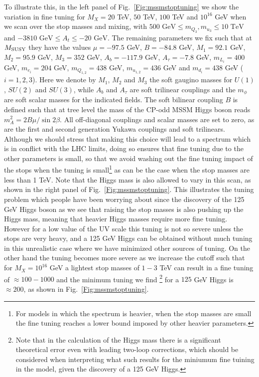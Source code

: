 \documentclass[preprint,amsmath,amssymb,aps,superscriptaddress,prd,
showpacs,floatfix,nofootinbib]{revtex4-1}
\begin{document}
To illustrate this, in the left panel of Fig.~\ref{Fig:mssmstoptuning}
we show the variation in fine tuning for $M_X = 20$ TeV, $50$ TeV, $100$
TeV and $10^{16}$ GeV when we scan over the stop masses and mixing,
with $500 \textrm{ GeV} \leq m_{Q_3} , m_{u_3} \leq 10 \textrm{ TeV}$ and
$-3810\textrm{ GeV} \leq A_t \leq -20 \textrm{ GeV}$.  The remaining
parameters we fix such that at $M_{\rm SUSY}$ they have the values
$\mu = -97.5$ GeV, $B = -84.8$ GeV, $M_1 = 92.1$ GeV, $M_2 = 95.9$ GeV,
$M_3 = 352$ GeV, $A_b = -117.9$ GeV, $A_\tau = -7.8$ GeV, $m_{L_i} = 400$ GeV,
$m_{e_i} = 204$ GeV, $m_{Q_{1,2}} = 438$ GeV, $m_{u_{1,2}} = 436$ GeV and
$m_{d_i} = 438$ GeV ($i = 1 , 2 , 3$).  Here we denote by $M_1$, $M_2$ and
$M_3$ the soft gaugino masses for $U(1)$, $SU(2)$ and $SU(3)$, while $A_b$ and
$A_\tau$ are soft trilinear couplings and the $m_\phi$ are soft scalar
masses for the indicated fields.  The soft bilinear coupling $B$ is defined
such that at tree level the mass of the CP-odd MSSM Higgs boson reads
$m_A^2 = 2 B \mu / \sin 2\beta$.  All off-diagonal couplings and scalar masses
are set to zero, as are the first and second generation Yukawa couplings
and soft trilinears.  Although we should stress that making
this choice will lead to a spectrum which is in conflict with the LHC
limits, doing so ensures that fine tuning due to the other parameters
is small, so that we avoid washing out the fine tuning impact of the
stops when the tuning is small\footnote{For models in which the
spectrum is heavier, when the stop masses are small the fine tuning
reaches a lower bound imposed by other heavier parameters.} as can
be the case when the stop masses are less than 1 TeV.  Note that the
Higgs mass is also allowed to vary in this scan, as shown in the right
panel of Fig.~\ref{Fig:mssmstoptuning}.  This illustrates the tuning
problem which people have been worrying about since the discovery of
the 125 GeV Higgs boson as we see that raising the stop masses is also
pushing up the Higgs mass, meaning that heavier Higgs masses require
more fine tuning.  However for a low value of the UV scale this tuning
is not so severe unless the stops are very heavy, and a 125 GeV Higgs
can be obtained without much tuning in this unrealistic case where we
have minimized other sources of tuning.  On the other hand the tuning
becomes more severe as we increase the cutoff such that for $M_X =
10^{16}$ GeV a lightest stop masses of $1-3$ TeV can result in a fine
tuning of $\approx 100 - 1000$ and the minimum tuning we find \footnote{Note that in the calculation of the Higgs mass there is a significant theoretical error even with leading two-loop corrections, which should be considered when interpreting what such results for the miniumum fine tuining in the model, given the discovery of a 125 GeV Higgs.}
for a $125$ GeV Higgs is $\approx 200$, as shown in
Fig.~\ref{Fig:mssmstoptuning}.
\end{document}

